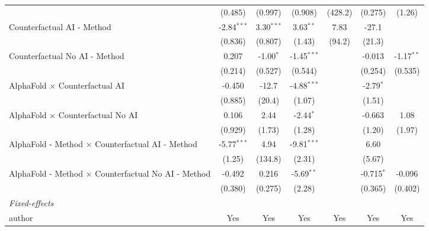 \begin{tabular}{lcccccc}
                                                              & (0.485)       & (0.997)       & (0.908)       & (428.2)      & (0.275)       & (1.26)\\   
   Counterfactual AI - Method                                 & -2.84$^{***}$ & 3.30$^{***}$  & 3.63$^{**}$   & 7.83         & -27.1         &   \\   
                                                              & (0.836)       & (0.807)       & (1.43)        & (94.2)       & (21.3)        &   \\   
   Counterfactual No AI - Method                              & 0.207         & -1.00$^{*}$   & -1.45$^{***}$ &              & -0.013        & -1.17$^{**}$\\   
                                                              & (0.214)       & (0.527)       & (0.544)       &              & (0.254)       & (0.535)\\   
   AlphaFold $\times$ Counterfactual AI                       & -0.450        & -12.7         & -4.88$^{***}$ &              & -2.79$^{*}$   &   \\   
                                                              & (0.885)       & (20.4)        & (1.07)        &              & (1.51)        &   \\   
   AlphaFold $\times$ Counterfactual No AI                    & 0.106         & 2.44          & -2.44$^{*}$   &              & -0.663        & 1.08\\   
                                                              & (0.929)       & (1.73)        & (1.28)        &              & (1.20)        & (1.97)\\   
   AlphaFold - Method $\times$ Counterfactual AI - Method     & -5.77$^{***}$ & 4.94          & -9.81$^{***}$ &              & 6.60          &   \\   
                                                              & (1.25)        & (134.8)       & (2.31)        &              & (5.67)        &   \\   
   AlphaFold - Method $\times$ Counterfactual No AI - Method  & -0.492        & 0.216         & -5.69$^{**}$  &              & -0.715$^{*}$  & -0.096\\   
                                                              & (0.380)       & (0.275)       & (2.28)        &              & (0.365)       & (0.402)\\   
   \midrule
   \emph{Fixed-effects}\\
   author                                                     & Yes           & Yes           & Yes           & Yes          & Yes           & Yes\\  

\end{tabular}
